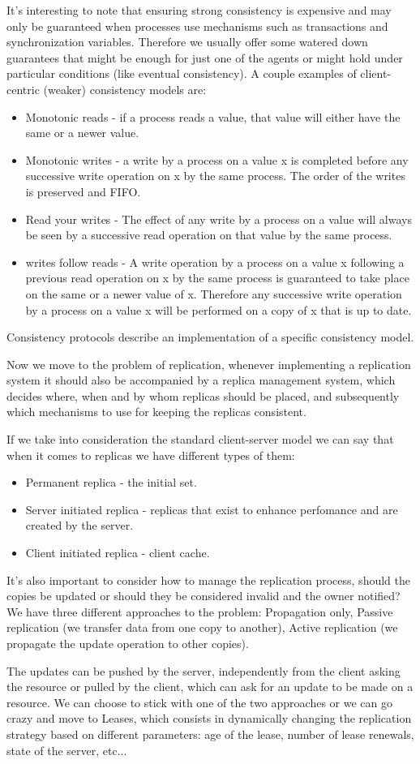 It's interesting to note that ensuring strong consistency is expensive and may only be guaranteed when processes use mechanisms such as transactions and synchronization variables. Therefore we usually offer some watered down guarantees that might be enough for just one of the agents or might hold under particular conditions (like eventual consistency). A couple examples of client-centric (weaker) consistency models are:
\begin{itemize}
	\item Monotonic reads - if a process reads a value, that value will either have the same or a newer value.
	\item Monotonic writes - a write by a process on a value x is completed before any successive write operation on x by the same process. The order of the writes is preserved and FIFO.
	\item Read your writes - The effect of any write by a process on a value will always be seen by a successive read operation on that value by the same process.
	\item writes follow reads - A write operation by a process on a value x following a previous read operation on x by the same process is guaranteed to take place on the same or a newer value of x. Therefore any successive write operation by a process on a value x will be performed on a copy of x that is up to date.
\end{itemize}
Consistency protocols describe an implementation of a specific consistency model.

Now we move to the problem of replication, whenever implementing a replication system it should also be accompanied by a replica management system, which decides where, when and by whom replicas should be placed, and subsequently which mechanisms to use for keeping the replicas consistent.

If we take into consideration the standard client-server model we can say that when it comes to replicas we have different types of them:
\begin{itemize}
	\item Permanent replica - the initial set.
	\item Server initiated replica - replicas that exist to enhance perfomance and are created by the server.
	\item Client initiated replica - client cache.
\end{itemize}
It's also important to consider how to manage the replication process, should the copies be updated or should they be considered invalid and the owner notified? We have three different approaches to the problem: Propagation only, Passive replication (we transfer data from one copy to another), Active replication (we propagate the update operation to other copies).

The updates can be pushed by the server, independently from the client asking the resource or pulled by the client, which can ask for an update to be made on a resource. We can choose to stick with one of the two approaches or we can go crazy and move to Leases, which consists in dynamically changing the replication strategy based on different parameters: age of the lease, number of lease renewals, state of the server, etc...
